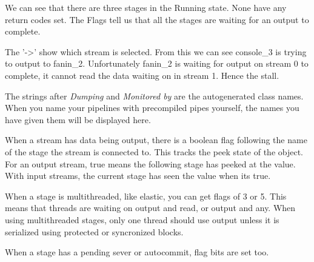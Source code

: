 We can see that there are three stages in the Running state.  None
have any return codes set.  The Flags tell us that all the stages are
waiting for an output to complete.

The '->' show which stream is
selected.  From this we can see console\_3 is trying to output to
fanin\_2. Unfortunately fanin\_2 is waiting for output on stream 0 to
complete, it cannot read the data waiting on in stream 1.  Hence the
stall.

The strings after \emph{Dumping} and \emph{Monitored by} are the
autogenerated class names. When you name your pipelines with
precompiled pipes yourself, the names you have given them will be displayed here.

When a stream has data being output, there is a boolean flag following the name of the stage the stream is connected to. This tracks the peek state of the object.  For an output stream, true means the following stage has peeked at the value. With input streams, the current stage has seen the value when its true.

When a stage is multithreaded, like elastic, you can get flags of 3 or 5. This means that threads are waiting on output and read, or output and any. When using multithreaded stages, only one thread should use output unless it is serialized using protected or syncronized blocks.

When a stage has a pending sever or autocommit, flag bits are set too.





 
  
